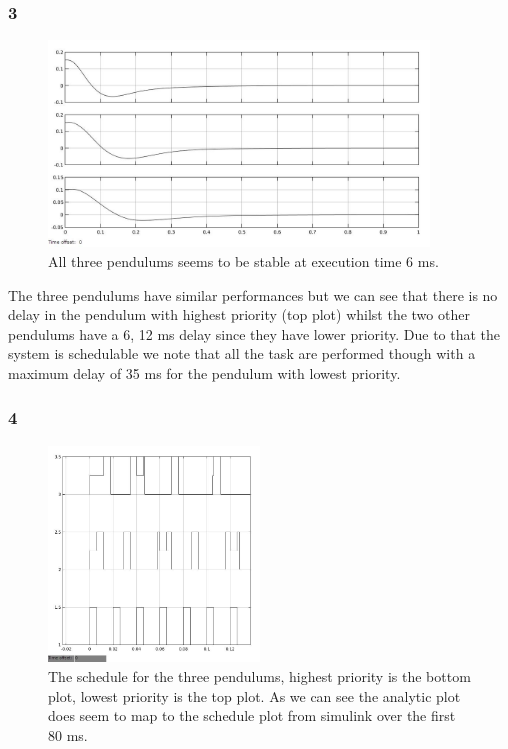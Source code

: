 \documentclass[10pt,a4paper]{article}
\begin{document}
\subsubsection*{3}
\begin{figure}[!ht]
  \centering
    \includegraphics[width=0.9\textwidth]{6ms.jpg}
      \caption{All three pendulums seems to be stable at execution time 6 ms.}
\end{figure}
The three pendulums have similar performances but we can see that there is no delay in the pendulum with highest priority (top plot) whilst the two other pendulums have a 6, 12 ms delay since they have lower priority. Due to that the system is schedulable we note that all the task are performed though with a maximum delay of 35 ms for the pendulum with lowest priority. 
\newpage
\subsubsection*{4}
\begin{figure}[!h]
  \centering
    \includegraphics[width=0.5\textwidth]{schedual6ms.jpg}
      \caption{The schedule for the three pendulums, highest priority is the bottom plot, lowest priority is the top plot. As we can see the analytic plot does seem to map to the schedule plot from simulink over the first 80 ms.}
\end{figure}
\end{document}
